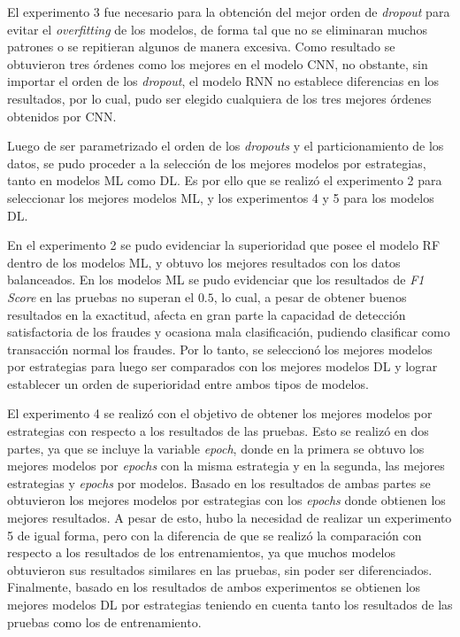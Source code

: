   El experimento 3 fue necesario para la obtenci\'{o}n del mejor orden de \textit{dropout} para evitar el \textit{overfitting} de los modelos, de forma tal que no se eliminaran muchos patrones o se repitieran algunos de manera excesiva. Como resultado se obtuvieron tres \'{o}rdenes como los mejores en el modelo CNN, no obstante, sin importar el orden de los \textit{dropout}, el modelo RNN no establece diferencias en los resultados, por lo cual, pudo ser elegido cualquiera de los tres mejores \'{o}rdenes obtenidos por CNN.
  
  Luego de ser parametrizado el orden de los \textit{dropouts} y el particionamiento de los datos, se pudo proceder a la selecci\'{o}n de los mejores modelos por estrategias, tanto en modelos ML como DL. Es por ello que se realiz\'{o} el experimento 2 para seleccionar los mejores modelos ML, y los experimentos 4 y 5 para los modelos DL.
  
  En el experimento 2 se pudo evidenciar la superioridad que posee el modelo RF dentro de los modelos ML, y obtuvo los mejores resultados con los datos balanceados. En los modelos ML se pudo evidenciar que los resultados de \textit{F1 Score} en las pruebas no superan el $0.5$, lo cual, a pesar de obtener buenos resultados en la exactitud, afecta en gran parte la capacidad de detecci\'{o}n satisfactoria de los fraudes y ocasiona mala clasificaci\'{o}n, pudiendo clasificar como transacci\'{o}n normal los fraudes. Por lo tanto, se seleccion\'{o} los mejores modelos por estrategias para luego ser comparados con los mejores modelos DL y lograr establecer un orden de superioridad entre ambos tipos de modelos.
  
  El experimento 4 se realiz\'{o} con el objetivo de obtener los mejores modelos por estrategias con respecto a los resultados de las pruebas. Esto se realiz\'{o} en dos partes, ya que se incluye la variable \textit{epoch}, donde en la primera se obtuvo los mejores modelos por \textit{epochs} con la misma estrategia y en la segunda, las mejores estrategias y \textit{epochs} por modelos. Basado en los resultados de ambas partes se obtuvieron los mejores modelos por estrategias con los \textit{epochs} donde obtienen los mejores resultados. A pesar de esto, hubo la necesidad de realizar un experimento 5 de igual forma, pero con la diferencia de que se realiz\'{o} la comparaci\'{o}n con respecto a los resultados de los entrenamientos, ya que muchos modelos obtuvieron sus resultados similares en las pruebas, sin poder ser diferenciados. Finalmente, basado en los resultados de ambos experimentos se obtienen los mejores modelos DL por estrategias teniendo en cuenta tanto los resultados de las pruebas como los de entrenamiento.
  

